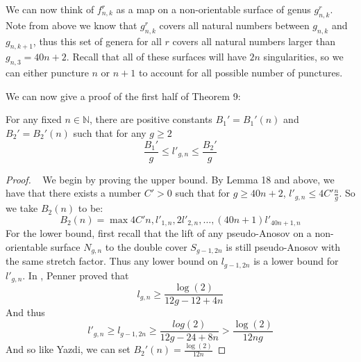 We can now think of $f^r_{n,k}$ as a map on a non-orientable surface of genus $g^r_{n,k}$. Note from above we know that $g^r_{n,k}$ covers all natural numbers between $g_{n,k}$ and $g_{n,k+1}$, thus this set of genera for all $r$ covers all natural numbers larger than $g_{n,3} = 40n + 2$. Recall that all of these surfaces will have $2n$ singularities, so we can either puncture $n$ or $n + 1$ to account for all possible number of punctures.

We can now give a proof of the first half of Theorem 9:

\begin{thm}[Theorem 9.1]
For any fixed $n \in \mathbb{N}$, there are positive constants $B_1' = B_1'(n)$ and $B_2' = B_2'(n)$ such that for any $g \geq 2$
$$\frac{B_1'}{g} \leq l'_{g,n} \leq \frac{B_2'}{g}$$
\end{thm}
\begin{proof}
    ~
    We begin by proving the upper bound. By Lemma 18 and above, we have that there exists a number $C' > 0$ such that for $g \geq 40n + 2$, $l'_{g,n} \leq 4C'\frac{n}{g}$. So we take $B_2(n)$ to be:
    $$B_2(n) = \max{4C'n, l'_{1,n}, 2l'_{2,n}, \dots, (40n + 1)l'_{40n+1,n}}$$
    For the lower bound, first recall that the lift of any pseudo-Anosov on a non-orientable surface $N_{g,n}$ to the double cover $S_{g-1,2n}$ is still pseudo-Anosov with the same stretch factor. Thus any lower bound on $l_{g-1,2n}$ is a lower bound for $l'_{g,n}$. In \cite{penner1991bounds}, Penner proved that
    $$l_{g,n} \geq \frac{\log(2)}{12g - 12 + 4n}$$
    And thus $$l'_{g,n} \geq l_{g-1,2n} \geq \frac{log(2)}{12g - 24 + 8n} > \frac{\log(2)}{12ng}$$
    And so like Yazdi, we can set $B_2'(n) = \frac{\log(2)}{12n}$
\end{proof}